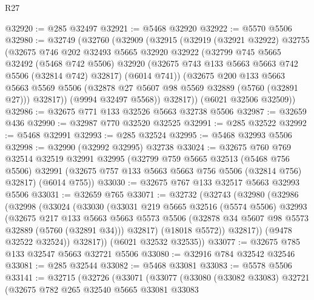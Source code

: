 \begin{lexlean}{R27}
\begin{coremodule}
@32920 := @285 @32497
@32921 := @5468 @32920
@32922 := @5570 @5506
@32980 := @32749
    (@32760
      (@32909
        (@32915
          (@32919
            (@32921 @32922)
            @32755
            (@32675
              @746
              @202
              @32493
              @5665
              @32920
              @32922
              (@32799
                @745
                @5665
                @32492
                (@5468 @742 @5506)
                @32920
                (@32675 @743 @133 @5663 @5663 @742 @5506 (@32814 @742) @32817)
                (@6014 @741))
              (@32675
                @200
                @133
                @5663
                @5663
                @5569
                @5506
                (@32878 @27 @5607 @98 @5569 @32889 (@5760 (@32891 @27)))
                @32817))
            (@9994 @32497 @5568))
          @32817))
      (@6021 @32506 @32509))
@32986 := @32675 @771 @133 @32526 @5663 @32738 @5506
@32987 := @32659 @436
@32990 := @32987 @770 @32520 @32525
@32991 := @285 @32522
@32992 := @5468 @32991
@32993 := @285 @32524
@32995 := @5468 @32993 @5506
@32998 := @32990 (@32992 @32995) @32738
@33024 := @32675
    @760
    @769
    @32514
    @32519
    @32991
    @32995
    (@32799
      @759
      @5665
      @32513
      (@5468 @756 @5506)
      @32991
      (@32675 @757 @133 @5663 @5663 @756 @5506 (@32814 @756) @32817)
      (@6014 @755))
@33030 := @32675 @767 @133 @32517 @5663 @32993 @5506
@33031 := @32659 @765
@33071 := @32732
    (@32743
      (@32980
        (@32986
          (@32998
            (@33024
              (@33030
                (@33031
                  @219
                  @5665
                  @32516
                  (@5574 @5506)
                  @32993
                  (@32675
                    @217
                    @133
                    @5663
                    @5663
                    @5573
                    @5506
                    (@32878 @34 @5607 @98 @5573 @32889 (@5760 (@32891 @34)))
                    @32817)
                  (@18018 @5572))
                @32817))
            (@9478 @32522 @32524))
          @32817))
      (@6021 @32532 @32535))
@33077 := @32675 @785 @133 @32547 @5663 @32721 @5506
@33080 := @32916 @784 @32542 @32546
@33081 := @285 @32544
@33082 := @5468 @33081
@33083 := @5578 @5506
@33141 := @32715
    (@32726
      (@33071
        (@33077
          (@33080
            (@33082 @33083)
            @32721
            (@32675
              @782
              @265
              @32540
              @5665
              @33081
              @33083

\end{coremodule}
\end{lexlean}
